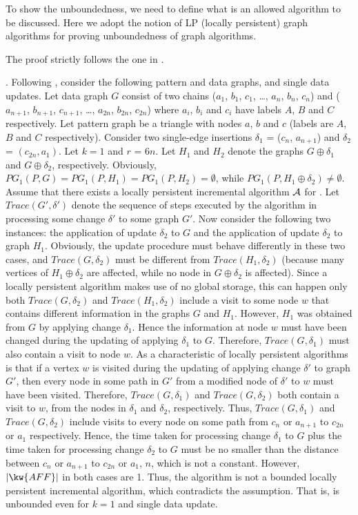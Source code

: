 To show the unboundedness, we need to define what is an allowed algorithm to be discussed.  Here we adopt the notion of LP (locally persistent) graph algorithms \cite{Reps96} for proving unboundedness of graph algorithms.

The proof strictly follows the one in \cite{Reps96}.

.
Following \cite{Reps96, FanWW13-tods}, consider the following pattern and data graphs, and single data updates. Let data graph $G$ consist of two chains ($a_1$, $b_1$, $c_1$, \ldots, $a_n$, $b_n$, $c_n$) and ($a_{n+1}$, $b_{n+1}$, $c_{n+1}$, \ldots, $a_{2n}$, $b_{2n}$, $c_{2n}$) where $a_i$, $b_i$ and $c_i$ have labels $A$, $B$ and $C$ respectively. Let pattern graph be a triangle with nodes $a$, $b$ and $c$ (labels are $A$, $B$ and $C$ respectively). Consider two single-edge insertions $\delta_1$ = ($c_n$, $a_{n+1}$) and $\delta_2$ = $(c_{2n}, a_1)$. Let $k = 1$ and $r$ = $6n$. Let $H_1$ and $H_2$ denote the graphs $G\oplus \delta_1$ and $G\oplus \delta_2$, respectively. Obviously, $PG_1(P, G) = PG_1(P, H_1) = PG_1(P, H_2) = \emptyset$, while $PG_1(P, H_1\oplus \delta_2) \neq \emptyset$. Assume that there exists a locally persistent incremental algorithm ${\cal A}$ for \dyngr. Let $Trace(G', \delta')$ denote the sequence of steps executed by the algorithm in processing some change $\delta'$ to some graph $G'$. Now consider the following two instances: the application of update $\delta_2$ to $G$ and the application of update $\delta_2$ to graph $H_1$. Obviously, the update procedure must behave differently in these two cases, and $Trace(G, \delta_2)$ must be different from $Trace(H_1, \delta_2)$ (because many vertices of $H_1\oplus \delta_2$ are affected, while no node in $G\oplus \delta_2$ is affected). Since a locally persistent algorithm makes use of no global storage, this can happen only both $Trace(G, \delta_2)$ and $Trace(H_1, \delta_2)$ include a visit to some node $w$ that contains different information in the graphs $G$ and $H_1$. However, $H_1$ was obtained from $G$ by applying change $\delta_1$. Hence the information at node $w$ must have been changed during the updating of applying $\delta_1$ to $G$. Therefore, $Trace(G, \delta_1)$ must also contain a visit to node $w$. As a characteristic of locally persistent algorithms is that if a vertex $w$ is visited during the updating of applying change $\delta'$ to graph $G'$, then every node in some path in $G'$ from a modified node of $\delta'$ to $w$ must have been visited.
Therefore, $Trace(G, \delta_1)$ and $Trace(G, \delta_2)$ both contain a visit to $w$, from the nodes in $\delta_1$ and $\delta_2$, respectively. Thus, $Trace(G, \delta_1)$ and $Trace(G, \delta_2)$ include visits to every node on some path from $c_n$ or $a_{n+1}$ to $c_{2n}$ or $a_1$ respectively. Hence, the time taken for processing change $\delta_1$ to $G$ plus the time taken for processing change $\delta_2$ to $G$ must be no smaller than the distance between $c_n$ or $a_{n+1}$ to $c_{2n}$ or $a_1$, \ie $n$, which is not a constant.
However, $|\kw{AFF}|$ in both cases are 1. Thus, the algorithm is not a bounded locally persistent incremental algorithm, which contradicts the assumption. That is, \dyngr is unbounded even for $k=1$ and single data update.


